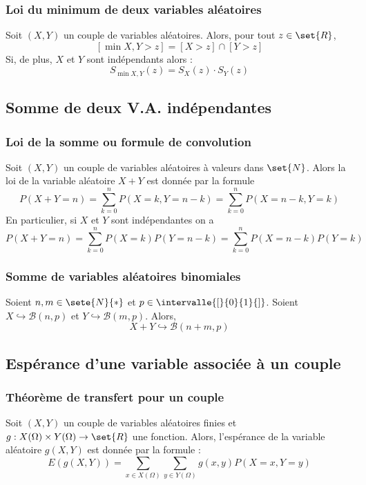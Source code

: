         \subsubsection{Loi du minimum de deux variables aléatoires}
            Soit $(X, Y)$ un couple de variables aléatoires. Alors, pour tout $z \in \set{R}$,
            \[
                [\min{X,Y} > z] = [X > z] \cap [Y > z] 
            \]
            Si, de plus, $X$ et $Y$ sont indépendants alors :
            \[
                S_{\min{X,Y}}(z) = S_X(z) \cdot S_Y(z) 
            \]

    \subsection{Somme de deux V.A. indépendantes}
        \subsubsection{Loi de la somme ou formule de convolution}
            Soit $(X, Y)$ un couple de variables aléatoires à valeurs dans $\set{N}$.
            Alors la loi de la variable aléatoire $X + Y$ est donnée par la formule
            \[
                P(X + Y = n) = \sum_{k = 0}^{n} P(X = k, Y = n - k) = \sum_{k = 0}^{n} P(X = n - k, Y = k)
            \]
            En particulier, si $X$ et $Y$ sont indépendantes on a 
            \[
                P(X + Y = n) = \sum_{k = 0}^{n} P(X = k)P(Y = n - k) = \sum_{k = 0}^{n} P(X = n - k)P(Y = k)
            \]

        \subsubsection{Somme de variables aléatoires binomiales}
            Soient $n, m \in \sete{N}{*}$ et $p \in \intervalle{[}{0}{1}{]}$.
            Soient $X \hookrightarrow \mathcal{B}(n, p)$ et $Y \hookrightarrow \mathcal{B}(m, p)$. Alors,
            \[
                X + Y \hookrightarrow \mathcal{B}(n + m, p)
            \]

    \subsection{Espérance d'une variable associée à un couple}
        \subsubsection{Théorème de transfert pour un couple}
            Soit $(X, Y)$ un couple de variables aléatoires finies et $g : X(\Omega) \times Y(\Omega) \rightarrow \set{R}$ une fonction.
            Alors, l'espérance de la variable aléatoire $g(X, Y)$ est donnée par la formule : 
            \[
                E(g(X, Y)) = \sum_{x \in X(\Omega)} \sum_{y \in Y(\Omega)} g(x, y)P(X = x, Y = y)
            \]

